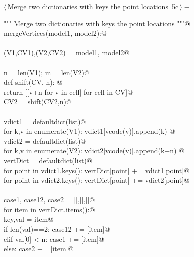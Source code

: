 \documentclass[11pt,oneside]{article}	%
\begin{document}
\begin{flushleft} \small \label{scrap3}
\protect{}$\langle\,$Merge two dictionaries with keys the point locations\nobreak\ {\footnotesize 5c}$\,\rangle\equiv$
\vspace{-1ex}
\begin{list}{}{} \item
\mbox{}\verb@""" Merge two dictionaries with keys the point locations """@\\
\mbox{}\verb@def mergeVertices(model1, model2):@\\
\mbox{}\verb@@\\
\mbox{}\verb@   (V1,CV1),(V2,CV2) = model1, model2@\\
\mbox{}\verb@@\\
\mbox{}\verb@   n = len(V1); m = len(V2)@\\
\mbox{}\verb@   def shift(CV, n): @\\
\mbox{}\verb@      return [[v+n for v in cell] for cell in CV]@\\
\mbox{}\verb@   CV2 = shift(CV2,n)@\\
\mbox{}\verb@@\\
\mbox{}\verb@   vdict1 = defaultdict(list)@\\
\mbox{}\verb@   for k,v in enumerate(V1): vdict1[vcode(v)].append(k) @\\
\mbox{}\verb@   vdict2 = defaultdict(list)@\\
\mbox{}\verb@   for k,v in enumerate(V2): vdict2[vcode(v)].append(k+n) @\\
\mbox{}\verb@   vertDict = defaultdict(list)@\\
\mbox{}\verb@   for point in vdict1.keys(): vertDict[point] += vdict1[point]@\\
\mbox{}\verb@   for point in vdict2.keys(): vertDict[point] += vdict2[point]@\\
\mbox{}\verb@@\\
\mbox{}\verb@   case1, case12, case2 = [],[],[]@\\
\mbox{}\verb@   for item in vertDict.items():@\\
\mbox{}\verb@      key,val = item@\\
\mbox{}\verb@      if len(val)==2:  case12 += [item]@\\
\mbox{}\verb@      elif val[0] < n: case1 += [item]@\\
\mbox{}\verb@      else: case2 += [item]@\\

\end{list}
\end{flushleft}
\end{document}
